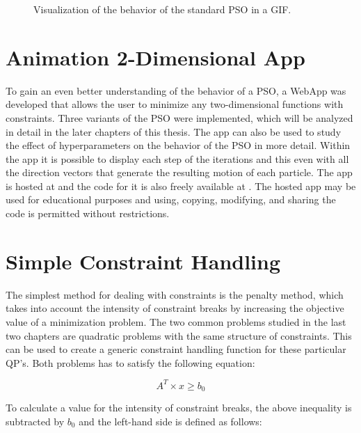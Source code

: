 \documentclass[
  oneside, a4paper, 12pt, openany]{book}
\theoremstyle{definition}
\theoremstyle{definition}
\theoremstyle{definition}
\theoremstyle{definition}
\theoremstyle{remark}
\begin{document}
\begin{center}
\begin{figure}[!h]
\caption{Visualization of the behavior of the standard PSO in a GIF.}
\end{figure}
\end{center}

\hypertarget{animation-2-dimensional-app}{%
\section{Animation 2-Dimensional App}\label{animation-2-dimensional-app}}

To gain an even better understanding of the behavior of a PSO, a WebApp was developed that allows the user to minimize any two-dimensional functions with constraints. Three variants of the PSO were implemented, which will be analyzed in detail in the later chapters of this thesis. The app can also be used to study the effect of hyperparameters on the behavior of the PSO in more detail. Within the app it is possible to display each step of the iterations and this even with all the direction vectors that generate the resulting motion of each particle. The app is hosted at \citep{PSOApp} and the code for it is also freely available at \citep{GitPSO}. The hosted app may be used for educational purposes and using, copying, modifying, and sharing the code is permitted without restrictions.

\hypertarget{simple-constraint-handling}{%
\section{Simple Constraint Handling}\label{simple-constraint-handling}}

The simplest method for dealing with constraints is the penalty method, which takes into account the intensity of constraint breaks by increasing the objective value of a minimization problem. The two common problems studied in the last two chapters are quadratic problems with the same structure of constraints. This can be used to create a generic constraint handling function for these particular QP's. Both problems has to satisfy the following equation:

\[
  A^T \times x  \geq b_0
\]

To calculate a value for the intensity of constraint breaks, the above inequality is subtracted by \(b_0\) and the left-hand side is defined as follows:
\end{document}

